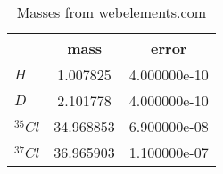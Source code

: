 \begin{table}
\centering
\caption{Masses from webelements.com}
\label{tab:masses}
\begin{tabular}{lcc}
\toprule
{} &       mass &         error \\
\midrule
$H$       &   1.007825 &  4.000000e-10 \\
$D$       &   2.101778 &  4.000000e-10 \\
$^{35}Cl$ &  34.968853 &  6.900000e-08 \\
$^{37}Cl$ &  36.965903 &  1.100000e-07 \\
\bottomrule
\end{tabular}
\end{table}

